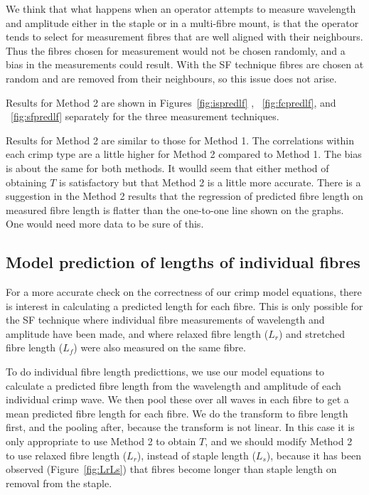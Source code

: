 \documentclass[titlepage,10pt]{article}  %
\begin{document}
We think that what happens when an operator attempts to measure wavelength and amplitude either in the staple or in a multi-fibre mount, is that the operator tends to select for measurement fibres that are well aligned with their neighbours. Thus the fibres chosen for measurement would not be chosen randomly, and a bias in the measurements could result. With the SF technique fibres are chosen at random and are removed from their neighbours, so this issue does not arise.

Results for Method 2 are shown in Figures~\ref{fig:ispredlf} , ~\ref{fig:fcpredlf}, and ~\ref{fig:sfpredlf} separately for the three measurement techniques.





Results for Method 2 are similar to those for Method 1. The correlations within each crimp type are a little higher for Method 2 compared to Method 1. The bias is about the same for both methods. It woulld seem that either method of obtaining $T$ is satisfactory but that Method 2 is a little more accurate. There is a suggestion in the Method 2 results that the regression of predicted fibre length on measured fibre length is flatter than the one-to-one line shown on the graphs. One would need more data to be sure of this.

\subsection{Model prediction of lengths of individual fibres}
For a more accurate check on the correctness of our crimp model equations, there is interest in calculating a predicted length for each fibre. This is only possible for the SF technique where individual fibre measurements of wavelength and amplitude have been made, and where relaxed fibre length ($L_{r}$) and stretched fibre length ($L_{f}$) were also measured on the same fibre.

 To do individual fibre length predicttions, we use our model equations to calculate a predicted fibre length from the wavelength and amplitude of each individual crimp wave. We then pool these over all waves in each fibre to get a mean predicted fibre length for each fibre. We do the transform to fibre length first, and the pooling after, because the transform is not linear. In this case it is only appropriate to use Method 2 to obtain $T$, and we should modify Method 2 to use relaxed fibre length ($L_{r}$), instead of staple length ($L_{s}$), because it has been observed (Figure~\ref{fig:LrLs}) that fibres become longer than staple length on removal from the staple.
\end{document}
